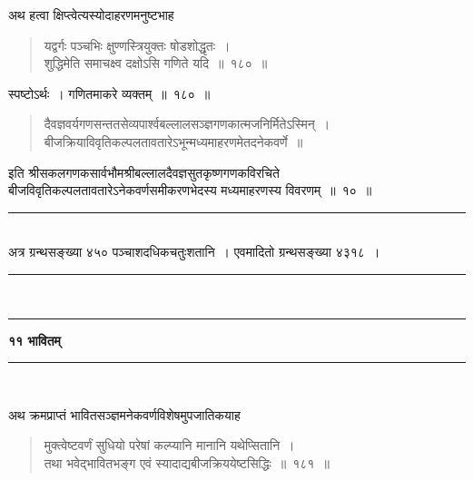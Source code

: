 \documentclass[11pt, openany]{book}
\begin{document}
\vspace{-2mm}
 अथ हत्वा क्षिप्त्वेत्यस्योदाहरणमनुष्टभाह\textendash 
\begin{quote}
    \eg 
    यद्वर्गः पञ्चभिः क्षुण्णस्त्रियुक्तः षोडशोद्धृतः~। \\
 शुद्धिमेति समाचक्ष्व दक्षोऽसि गणिते यदि~॥~१८०~॥

\end{quote}
  
स्पष्टोऽर्थः~। गणितमाकरे व्यक्तम्~॥~१८०~॥

 \begin{quote}
     {\qt दैवज्ञवर्यगणसन्ततसेव्यपार्श्वबल्लालसञ्ज्ञगणकात्मजनिर्मितेऽस्मिन्~।\\
 बीजक्रियाविवृतिकल्पलतावतारेऽभून्मध्यमाहरणमेतदनेकवर्णे~॥}
 \end{quote}
 
\newpage
\begin{center}
इति श्रीसकलगणकसार्वभौमश्रीबल्लालदैवज्ञसुतकृष्णगणकविरचिते\\
 बीजविवृतिकल्पलतावतारेऽनेकवर्णसमीकरणभेदस्य मध्यमाहरणस्य विवरणम्~॥~१०~॥\\
\vspace{2mm}

    \rule{0.2\linewidth}{0.5pt}\\
 \vspace{10mm}
अत्र ग्रन्थसङ्ख्या ४५० पञ्चाशदधिकचतुःशतानि~। एवमादितो ग्रन्थसङ्ख्या
४३१८~। \\
    \vspace{5mm}
    \rule{0.3\linewidth}{0.5pt}\\
    \vspace{-5mm}
    
    \rule{0.3\linewidth}{0.5pt}
\end{center}
\newpage
 \label{ch11}
\begin{center}
{\LARGE \textbf{११ भावितम्}}\\
    \rule{0.2\linewidth}{0.5pt}\\
\end{center}

 अथ क्रमप्राप्तं भावितसञ्ज्ञमनेकवर्णविशेषमुपजातिकयाह\textendash
\begin{quote}
    \ab 
     मुक्त्वेष्टवर्णं सुधियो परेषां कल्प्यानि मानानि यथेप्सितानि~। \\
 तथा भवेद्भावितभङ्ग एवं स्यादाद्यबीजक्रिययेष्टसिद्धिः~॥~१८१~॥~
\end{quote}
 
\end{document}
